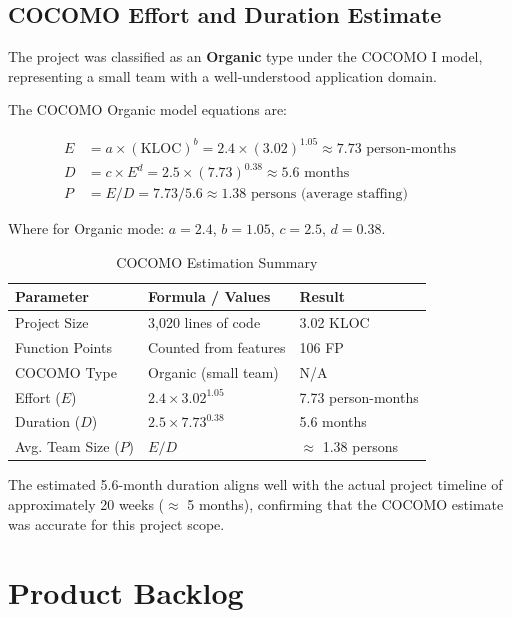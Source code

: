 \documentclass[12pt,a4paper]{report}
\begin{document}
\subsection{COCOMO Effort and Duration Estimate}

The project was classified as an \textbf{Organic} type under the COCOMO I model, representing a small team with a well-understood application domain.

The COCOMO Organic model equations are:

\begin{align}
  E  &= a \times (\text{KLOC})^b = 2.4 \times (3.02)^{1.05} \approx \mathbf{7.73} \text{ person-months} \\
  D  &= c \times E^d = 2.5 \times (7.73)^{0.38} \approx \mathbf{5.6} \text{ months} \\
  P  &= E / D = 7.73 / 5.6 \approx \mathbf{1.38} \text{ persons (average staffing)}
\end{align}

Where for Organic mode: $a = 2.4$, $b = 1.05$, $c = 2.5$, $d = 0.38$.

\begin{table}[H]
  \centering
  \caption{COCOMO Estimation Summary}
  \begin{tabular}{lll}
    \toprule
    \textbf{Parameter} & \textbf{Formula / Values} & \textbf{Result} \\
    \midrule
    Project Size        & 3,020 lines of code         & 3.02 KLOC \\
    Function Points     & Counted from features       & 106 FP \\
    COCOMO Type         & Organic (small team)        & N/A \\
    Effort ($E$)        & $2.4 \times 3.02^{1.05}$   & 7.73 person-months \\
    Duration ($D$)      & $2.5 \times 7.73^{0.38}$   & 5.6 months \\
    Avg. Team Size ($P$)& $E / D$                    & $\approx$ 1.38 persons \\
    \bottomrule
  \end{tabular}
\end{table}

The estimated 5.6-month duration aligns well with the actual project timeline of approximately 20 weeks ($\approx$ 5 months), confirming that the COCOMO estimate was accurate for this project scope.

\section{Product Backlog}
\end{document}
